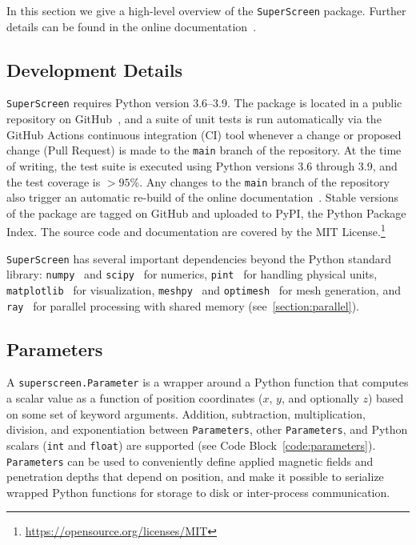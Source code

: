 \documentclass[final,3p,times]{elsarticle}
\newcommand{\inline}[1]{\texttt{#1}\xspace}
\newcommand{\SuperScreen}{\inline{SuperScreen}}
\begin{document}
In this section we give a high-level overview of the \SuperScreen package. Further details can be found in the online documentation~\cite{superscreen-rtd}.

\subsection{Development Details}
\label{section:overview:development}

\SuperScreen requires Python version 3.6--3.9. The package is located in a public repository on GitHub~\cite{superscreen}, and a suite of unit tests is run automatically via the GitHub Actions continuous integration (CI) tool whenever a change or proposed change (Pull Request) is made to the \inline{main} branch of the repository. At the time of writing, the test suite is executed using Python versions 3.6 through 3.9, and the test coverage is $>95\%$. Any changes to the \inline{main} branch of the repository also trigger an automatic re-build of the online documentation~\cite{superscreen-rtd}. Stable versions of the package are tagged on GitHub and uploaded to PyPI, the Python Package Index. The source code and documentation are covered by the MIT License.\footnote{\href{https://opensource.org/licenses/MIT}{https://opensource.org/licenses/MIT}}

\SuperScreen has several important dependencies beyond the Python standard library: \inline{numpy}~\cite{Harris2020-xv} and \inline{scipy}~\cite{Virtanen2020-zz} for numerics, \inline{pint}~\cite{Grecco} for handling physical units, \inline{matplotlib}~\cite{Hunter2007-il} for visualization, \inline{meshpy}~\cite{Klockner, Shewchuk, Shewchuk1996-va} and \inline{optimesh}~\cite{Schlomer2021-ua} for mesh generation, and \inline{ray}~\cite{Moritz2018-mt,ray-docs} for parallel processing with shared memory (see~\ref{section:parallel}).

\subsection{Parameters}
\label{section:overview:parameter}

A \inline{superscreen.Parameter} is a wrapper around a Python function that computes a scalar value as a function of position coordinates ($x$, $y$, and optionally $z$) based on some set of keyword arguments. Addition, subtraction, multiplication, division, and exponentiation between \inline{Parameters}, other \inline{Parameters}, and Python scalars (\inline{int} and \inline{float}) are supported (see Code Block~\ref{code:parameters}). \inline{Parameters} can be used to conveniently define applied magnetic fields and penetration depths that depend on position, and make it possible to serialize wrapped Python functions for storage to disk or inter-process communication.
\end{document}
